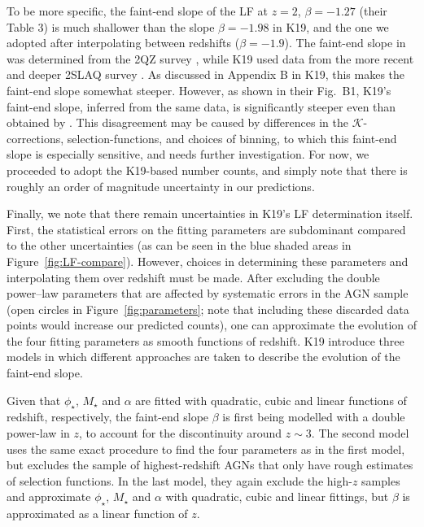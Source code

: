 \documentclass[fleqn,usenatbib]{mnras}
\begin{document}
To be more specific, the faint-end slope of the \citet{Hopkins2007} LF at $z=2$, $\beta=-1.27$ (their Table 3) is much shallower than the slope  $\beta=-1.98$ in K19, and the one we adopted after interpolating between redshifts ($\beta=-1.9$).  
The faint-end slope in \citet{Hopkins2007} was determined from the 2QZ survey \citep{Croom+2004}, while K19 used data from the more recent and deeper 2SLAQ survey \citep{Croom+2009}.
As discussed in Appendix B in K19, this makes the faint-end slope somewhat steeper.  However, as shown in their Fig.~B1, K19's faint-end slope, inferred from the same data, is significantly steeper even than obtained by \citet{Croom+2009}.  This disagreement may be caused by differences in 
the $\mathcal{K}$-corrections, selection-functions, and choices of binning, to which this faint-end slope is especially sensitive, and needs further investigation.   For now, we proceeded to adopt the K19-based number counts, and simply note that there is roughly an order of magnitude uncertainty in our predictions.

Finally, we note that there remain uncertainties in K19's LF determination itself.  First, the statistical errors on the fitting parameters are subdominant compared to the other uncertainties (as can be seen in the blue shaded areas in Figure~\ref{fig:LF-compare}).
However, choices in determining these parameters and interpolating them over redshift must be made. After excluding the double power--law parameters  that are affected by systematic errors in the AGN sample (open circles in Figure~\ref{fig:parameters}; note that including these discarded data points would increase our predicted counts), one can approximate the evolution of the four fitting parameters as smooth functions of redshift. K19 introduce three models in which different approaches are taken to describe the evolution of the faint-end slope. 

Given that $\phi_{\star}$, $M_{\star}$ and $\alpha$ are fitted with quadratic, cubic and linear functions 
of redshift, respectively, the faint-end slope $\beta$ is first being modelled with a double power-law in $z$, to account for the discontinuity around $z\sim 3$.
The second model uses the same exact procedure to find the four  parameters as in the first model, but excludes the sample of highest-redshift AGNs that only have rough estimates of selection functions. In the last model, they again exclude the high-$z$ samples and approximate $\phi_{\star}$, $M_{\star}$ and $\alpha$ with quadratic, cubic and linear fittings, but $\beta$ is approximated as a linear function of $z$. 
\end{document}
